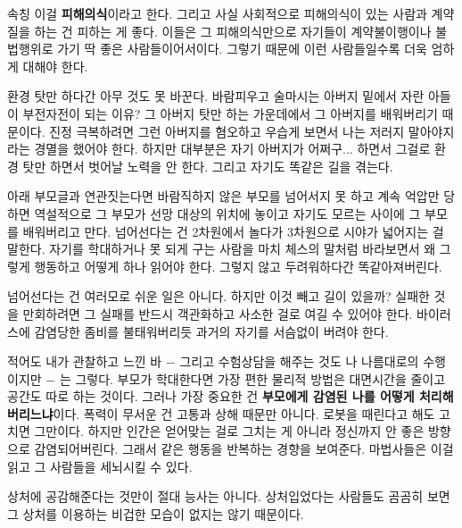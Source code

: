 속칭 이걸 \textbf{피해의식}이라고 한다.
그리고 사실 사회적으로 피해의식이 있는 사람과 계약질을 하는 건 피하는 게 좋다.
이들은 그 피해의식만으로 자기들이 계약불이행이나 불법행위로 가기 딱 좋은 사람들이어서이다.
그렇기 때문에 이런 사람들일수록 더욱 엄하게 대해야 한다.
\vspace{5mm}

환경 탓만 하다간 아무 것도 못 바꾼다.
바람피우고 술마시는 아버지 밑에서 자란 아들이 부전자전이 되는 이유?
그 아버지 탓만 하는 가운데에서 그 아버지를 배워버리기 때문이다.
진정 극복하려면 그런 아버지를 혐오하고 우습게 보면서 나는 저러지 말아야지라는 경멸을 했어야 한다.
하지만 대부분은 자기 아버지가 어쩌구... 하면서 그걸로 환경 탓만 하면서 벗어날 노력을 안 한다. 그리고 자기도 똑같은 길을 겪는다.
\vspace{5mm}

아래 부모글과 연관짓는다면 바람직하지 않은 부모를 넘어서지 못 하고 계속 억압만 당하면
역설적으로 그 부모가 선망 대상의 위치에 놓이고 자기도 모르는 사이에 그 부모를 배워버리고 만다.
넘어선다는 건 2차원에서 놀다가 3차원으로 시야가 넓어지는 걸 말한다.
자기를 학대하거나 못 되게 구는 사람을 마치 체스의 말처럼 바라보면서 왜 그렇게 행동하고 어떻게 하나 읽어야 한다.
그렇지 않고 두려워하다간 똑같아져버린다.
\vspace{5mm}

넘어선다는 건 여러모로 쉬운 일은 아니다. 하지만 이것 빼고 길이 있을까?
실패한 것을 만회하려면 그 실패를 반드시 객관화하고 사소한 걸로 여길 수 있어야 한다.
바이러스에 감염당한 좀비를 불태워버리듯 과거의 자기를 서슴없이 버려야 한다.
\vspace{5mm}

적어도 내가 관찰하고 느낀 바 $-$ 그리고 수험상담을 해주는 것도 나 나름대로의 수행이지만 $-$ 는 그렇다.
부모가 학대한다면 가장 편한 물리적 방법은 대면시간을 줄이고 공간도 따로 하는 것이다.
그러나 가장 중요한 건 \textbf{부모에게 감염된 나를 어떻게 처리해버리느냐}이다.
폭력이 무서운 건 고통과 상해 때문만 아니다. 로봇을 때린다고 해도 고치면 그만이다.
하지만 인간은 얻어맞는 걸로 그치는 게 아니라 정신까지 안 좋은 방향으로 감염되어버린다.
그래서 같은 행동을 반복하는 경향을 보여준다. 마법사들은 이걸 읽고 그 사람들을 세뇌시킬 수 있다.
\vspace{5mm}

상처에 공감해준다는 것만이 절대 능사는 아니다.
상처입었다는 사람들도 곰곰히 보면 그 상처를 이용하는 비겁한 모습이 없지는 않기 때문이다.
\vspace{5mm}





